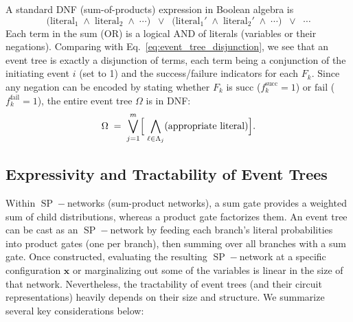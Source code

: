 A standard DNF (sum-of-products) expression in Boolean algebra is
\[
    \bigl(\text{literal}_1 \;\wedge\;\text{literal}_2 \;\wedge\;\cdots\bigr)
    \;\;\lor\;\;
    \bigl(\text{literal}_{1}' \;\wedge\;\text{literal}_{2}' \;\wedge\;\cdots\bigr)
    \;\;\lor\;\;\cdots
\]
Each term in the sum (OR) is a logical AND of literals (variables or their negations). Comparing with Eq.~\eqref{eq:event_tree_disjunction}, we see that an event tree is exactly a disjunction of terms, each term being a conjunction of the initiating event \(i\) (set to 1) and the success/failure indicators for each \(F_k\). Since any negation can be encoded by stating whether \(F_k\) is \(\text{succ}\) (\(f_k^{\text{succ}}=1\)) or \(\text{fail}\) (\(f_k^{\text{fail}}=1\)), the entire event tree \(\Omega\) is in DNF:
\[
    \Omega \;=\; 
    \bigvee_{j=1}^m
    \Bigl[
        \;\bigwedge_{\ell\in \Lambda_j}
        (\text{appropriate literal})
    \Bigr].
\]

\subsection{Expressivity and Tractability of Event Trees}
\label{sec:tractability_event_trees}

Within \(\operatorname{SP}\!-\)networks (sum-product networks), a sum gate provides a weighted sum of child distributions, whereas a product gate factorizes them.  An event tree can be cast as an \(\operatorname{SP}\!-\)network by feeding each branch’s literal probabilities into product gates (one per branch), then summing over all branches with a sum gate.  Once constructed, evaluating the resulting \(\operatorname{SP}\!-\)network at a specific configuration \(\mathbf{x}\) or marginalizing out some of the variables is linear in the size of that network.  Nevertheless, the tractability of event trees (and their circuit representations) heavily depends on their size and structure.  We summarize several key considerations below:

